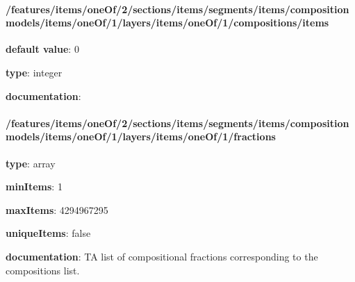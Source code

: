 \begin{itemized}
\paragraph{/features/items/oneOf/2/sections/items/segments/items/composition models/items/oneOf/1/layers/items/oneOf/1/compositions/items} \begin{itemized}
\item {\bf default value}: 0
\item {\bf type}: integer
\item {\bf documentation}: 
\end{itemized}\end{itemized}\paragraph{/features/items/oneOf/2/sections/items/segments/items/composition models/items/oneOf/1/layers/items/oneOf/1/fractions} \begin{itemized}
\item {\bf type}: array
\item {\bf minItems}: 1
\item {\bf maxItems}: 4294967295
\item {\bf uniqueItems}: false
\item {\bf documentation}: TA list of compositional fractions corresponding to the compositions list.

\end{itemized}
